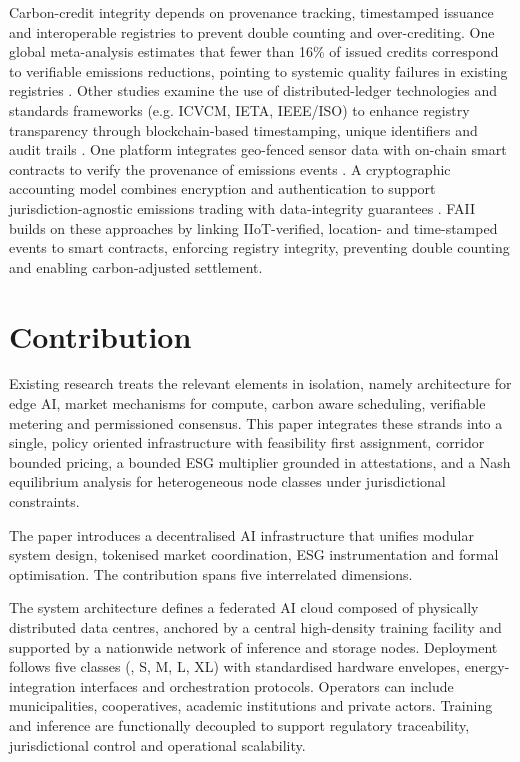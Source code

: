 \documentclass[oneside,10pt]{swissi}
\begin{document}
Carbon-credit integrity depends on provenance tracking, timestamped issuance and interoperable registries to prevent double counting and over-crediting. One global meta-analysis estimates that fewer than 16\% of issued credits correspond to verifiable emissions reductions, pointing to systemic quality failures in existing registries \cite{Nature2024}. Other studies examine the use of distributed-ledger technologies and standards frameworks (e.g. ICVCM, IETA, IEEE/ISO) to enhance registry transparency through blockchain-based timestamping, unique identifiers and audit trails \cite{Baiz2024}. One platform integrates geo-fenced sensor data with on-chain smart contracts to verify the provenance of emissions events \cite{Boumaiza2024}. A cryptographic accounting model combines encryption and authentication to support jurisdiction-agnostic emissions trading with data-integrity guarantees \cite{Li2020}. FAII builds on these approaches by linking IIoT-verified, location- and time-stamped events to smart contracts, enforcing registry integrity, preventing double counting and enabling carbon-adjusted settlement.

\section{Contribution}

Existing research treats the relevant elements in isolation, namely architecture for edge AI, market mechanisms for compute, carbon aware scheduling, verifiable metering and permissioned consensus. This paper integrates these strands into a single, policy oriented infrastructure with feasibility first assignment, corridor bounded pricing, a bounded ESG multiplier grounded in attestations, and a Nash equilibrium analysis for heterogeneous node classes under jurisdictional constraints.

The paper introduces a decentralised AI infrastructure that unifies modular system design, tokenised market coordination, ESG instrumentation and formal optimisation. The contribution spans five interrelated dimensions.

The system architecture defines a federated AI cloud composed of physically distributed data centres, anchored by a central high-density training facility and supported by a nationwide network of inference and storage nodes. Deployment follows five classes (\textmu, S, M, L, XL) with standardised hardware envelopes, energy-integration interfaces and orchestration protocols. Operators can include municipalities, cooperatives, academic institutions and private actors. Training and inference are functionally decoupled to support regulatory traceability, jurisdictional control and operational scalability.
\end{document}
